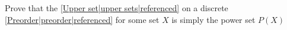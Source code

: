 

Prove that the \ref{Upper set|upper sets|referenced} on a discrete \ref{Preorder|preorder|referenced} for some set $X$ is simply the power set $P(X)$